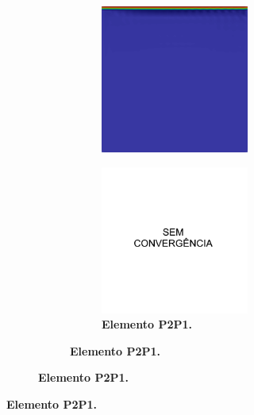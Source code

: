 \begin{figure}[h!]
\begin{subfigure}{\textwidth}
\begin{subfigure}{\textwidth}
\begin{subfigure}{.32\textwidth}
                \includegraphics[width=\linewidth]{Figuras/cavity-poor/None-Qua.png}
            \end{subfigure}
            \begin{subfigure}{.32\textwidth}
                \caption*{\textbf{Elemento P2P1.}}
                \includegraphics[width=\linewidth]{Figuras/cavity-poor/None-TH.png}

\end{subfigure}
\end{subfigure}
\end{subfigure}
\end{figure}
